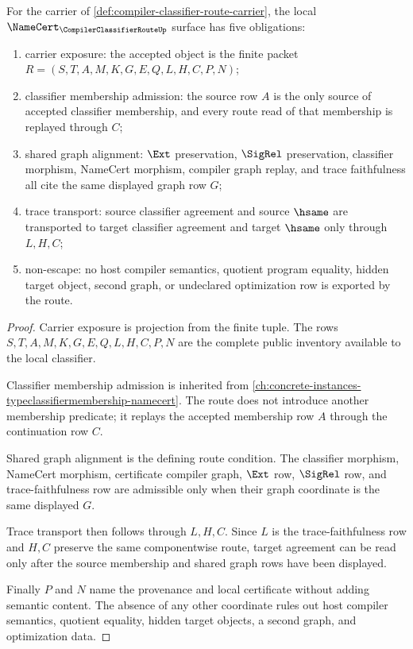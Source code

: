 \begin{theorem}
\label{thm:compiler-classifier-route-namecert-obligations}
For the carrier of \autoref{def:compiler-classifier-route-carrier}, the local $\NameCert_{\CompilerClassifierRouteUp}$ surface has five obligations:
\begin{enumerate}
\item carrier exposure: the accepted object is the finite packet $R=(S,T,A,M,K,G,E,Q,L,H,C,P,N)$;
\item classifier membership admission: the source row $A$ is the only source of accepted classifier membership, and every route read of that membership is replayed through $C$;
\item shared graph alignment: $\Ext$ preservation, $\SigRel$ preservation, classifier morphism, NameCert morphism, compiler graph replay, and trace faithfulness all cite the same displayed graph row $G$;
\item trace transport: source classifier agreement and source $\hsame$ are transported to target classifier agreement and target $\hsame$ only through $L,H,C$;
\item non-escape: no host compiler semantics, quotient program equality, hidden target object, second graph, or undeclared optimization row is exported by the route.
\end{enumerate}
\end{theorem}
\begin{proof}
Carrier exposure is projection from the finite tuple. The rows $S,T,A,M,K,G,E,Q,L,H,C,P,N$ are the complete public inventory available to the local classifier.

Classifier membership admission is inherited from \autoref{ch:concrete-instances-typeclassifiermembership-namecert}. The route does not introduce another membership predicate; it replays the accepted membership row $A$ through the continuation row $C$.

Shared graph alignment is the defining route condition. The classifier morphism, NameCert morphism, certificate compiler graph, $\Ext$ row, $\SigRel$ row, and trace-faithfulness row are admissible only when their graph coordinate is the same displayed $G$.

Trace transport then follows through $L,H,C$. Since $L$ is the trace-faithfulness row and $H,C$ preserve the same componentwise route, target agreement can be read only after the source membership and shared graph rows have been displayed.

Finally $P$ and $N$ name the provenance and local certificate without adding semantic content. The absence of any other coordinate rules out host compiler semantics, quotient equality, hidden target objects, a second graph, and optimization data.
\end{proof}

